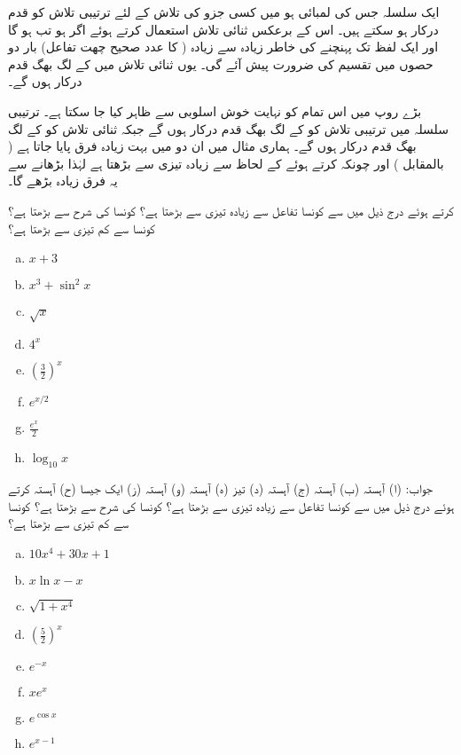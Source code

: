 ایک سلسلہ جس کی لمبائی  ہو میں کسی جزو کی تلاش کے لئے ترتیبی تلاش کو  قدم درکار ہو سکتے ہیں۔ اس کے برعکس ثنائی تلاش استعمال کرتے ہوئے  اگر  ہو تب  ہو گا اور ایک لفظ تک پہنچنے کی خاطر زیادہ سے زیادہ  ( کا عدد صحیح چھت تفاعل)  بار دو حصوں میں تقسیم کی ضرورت پیش آئے گی۔ یوں ثنائی تلاش میں   کے لگ بھگ  قدم درکار ہوں گے۔ 

بڑے  روپ میں اس تمام کو نہایت خوش اسلوبی سے ظاہر کیا جا سکتا ہے۔ ترتیبی سلسلہ میں ترتیبی تلاش کو  کے لگ بھگ قدم درکار ہوں گے جبکہ ثنائی تلاش کو  کے لگ بھگ قدم درکار ہوں گے۔ ہماری مثال میں ان دو میں بہت زیادہ فرق پایا جاتا ہے ( بالمقابل ) اور چونکہ  کرتے ہوئے  کے لحاظ سے  زیادہ تیزی سے بڑھتا ہے لہٰذا  بڑھانے سے یہ فرق زیادہ بڑھے گا۔



 کرتے ہوئے درج ذیل میں سے کونسا تفاعل  سے زیادہ تیزی سے بڑھتا ہے؟ کونسا  کی شرح سے بڑھتا ہے؟  کونسا  سے کم تیزی سے بڑھتا ہے؟
\begin{multicols}{4}
\begin{enumerate}[a.]
\item
$x+3$
\item
$x^3+\sin^2x$
\item
$\sqrt{x}$
\item
$4^x$
\item
$(\tfrac{3}{2})^x$
\item
$e^{x/2}$
\item
$\frac{e^x}{2}$
\item
$\log_{10}x$
\end{enumerate}
\end{multicols}
جواب:\quad
(ا) آہستہ (ب) آہستہ (ج) آہستہ (د) تیز (ہ) آہستہ  (و) آہستہ (ز) ایک جیسا (ح) آہستہ
 کرتے ہوئے درج ذیل میں سے کونسا تفاعل  سے زیادہ تیزی سے بڑھتا ہے؟ کونسا  کی شرح سے بڑھتا ہے؟  کونسا  سے کم تیزی سے بڑھتا ہے؟
\begin{multicols}{4}
\begin{enumerate}[a.]
\item
$10x^4+30x+1$
\item
$x\ln x-x$
\item
$\sqrt{1+x^4}$
\item
$(\tfrac{5}{2})^x$
\item
$e^{-x}$
\item
$xe^x$
\item
$e^{\cos x}$
\item
$e^{x-1}$
\end{enumerate}
\end{multicols}

